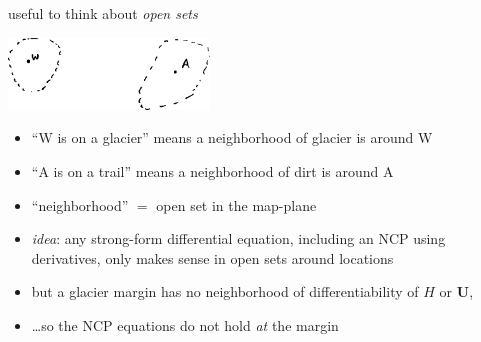 \documentclass[10pt,hyperref,dvipsnames]{beamer}
\newcommand{\bU}{\mathbf{U}}
\begin{document}
\begin{frame}{useful to think about \emph{open sets}}

\begin{center}
\includegraphics[width=0.4\textwidth]{figs/opensets.png}
\end{center}

\begin{itemize}
\item ``W is on a glacier'' means a neighborhood of glacier is around W
\item ``A is on a trail'' means a neighborhood of dirt is around A
\item ``neighborhood'' $=$ open set in the map-plane

\medskip
\item \emph{idea}:  any strong-form differential equation, including an NCP using derivatives, only makes sense in open sets around locations

\medskip
\item but a glacier margin has no neighborhood of differentiability of $H$ or $\bU$,
\item \dots so the NCP equations do \alert{not} hold \emph{at} the margin
\end{itemize}
\end{frame}
\end{document}
